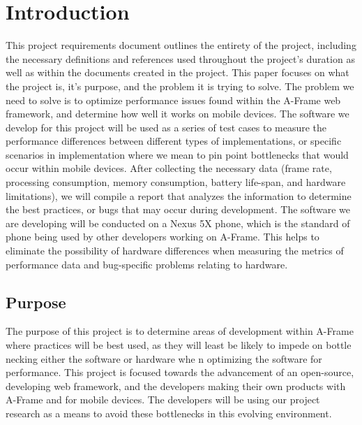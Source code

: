 \documentclass[letterpaper,10pt,draftclsnofoot,onecolumn,compsoc]{IEEEtran}
\begin{document}
\section{Introduction}
\begin{singlespace}
\noindent
This project requirements document outlines the entirety of the project, including the necessary definitions and references used throughout the project's duration as well as within the documents created in the project. This paper focuses on what the project is, it's purpose, and the problem it is trying to solve. The problem we need to solve is to optimize performance issues found within the A-Frame web framework, and determine how well it works on mobile devices. The software we develop for this project will be used as a series of test cases to measure the performance differences between different types of implementations, or specific scenarios in implementation where we mean to pin point bottlenecks that would occur within mobile devices. After collecting the necessary data (frame rate, processing consumption, memory consumption, battery life-span, and hardware limitations), we will compile a report that analyzes the information to determine the best practices, or bugs that may occur during development. The software we are developing will be conducted on a Nexus 5X phone, which is the standard of phone being used by other developers working on A-Frame. This helps to eliminate the possibility of hardware differences when measuring the metrics of performance data and bug-specific problems relating to hardware.
\end{singlespace}

\subsection{Purpose}
\begin{singlespace}
\noindent
The purpose of this project is to determine areas of development within A-Frame where practices will be best used, as they will least be likely to impede on bottle necking either the software or hardware whe n optimizing the software for performance. This project is focused towards the advancement of an open-source, developing web framework, and the developers making their own products with A-Frame and for mobile devices. The developers will be using our project research as a means to avoid these bottlenecks in this evolving environment.
\end{singlespace}
\end{document}
